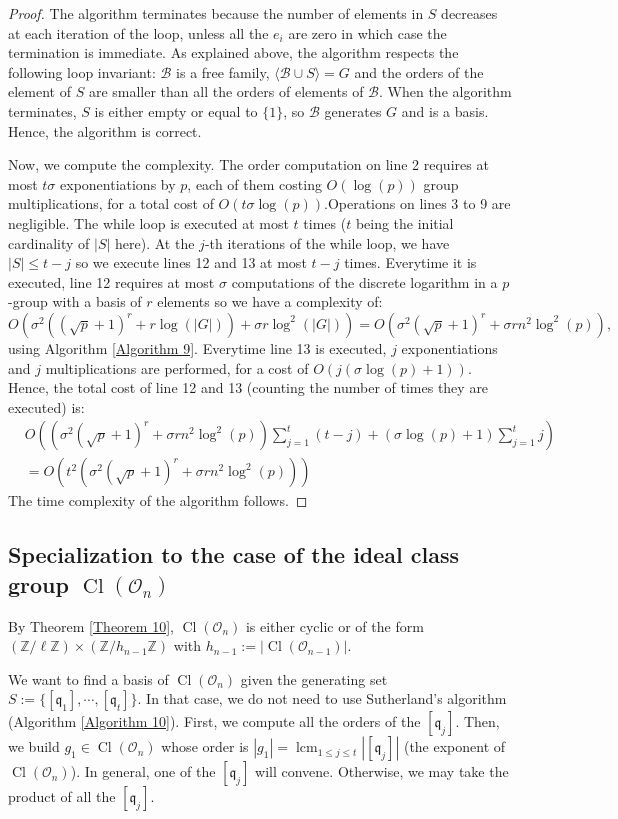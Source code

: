\documentclass[a4paper,10pt,notitlepage]{report}
\theoremstyle{definition}
\theoremstyle{plain}
\theoremstyle{definition}
\newcommand{\Z}{\mathbb{Z}}
\newcommand{\m}[1]{\mathcal{#1}}
\newcommand{\mO}{\mathcal{O}}
\renewcommand{\(}{\left(}
\renewcommand{\)}{\right)}
\newcommand{\mf}[1]{\mathfrak{#1}}
\DeclareMathOperator{\Cl}{Cl}
\DeclareMathOperator{\lcm}{lcm}
\begin{document}
\begin{proof}
The algorithm terminates because the number of elements in $S$ decreases at each iteration of the loop, unless all the $e_i$ are zero in which case the termination is immediate.  As explained above, the algorithm respects the following loop invariant: $\m{B}$ is a free family, $\langle\m{B}\cup S\rangle=G$ and the orders of the element of $S$ are smaller than all the orders of elements of $\m{B}$.  When the algorithm terminates, $S$ is either empty or equal to $\{1\}$, so $\m{B}$ generates $G$ and is a basis. Hence, the algorithm is correct.

Now, we compute the complexity. The order computation on line 2 requires at most $t\sigma$ exponentiations by $p$, each of them costing $O(\log(p))$ group multiplications, for a total cost of $O(t\sigma\log(p))$.Operations on lines 3 to 9 are negligible. The while loop is executed at most $t$ times ($t$ being the initial cardinality of $|S|$ here). At the $j$-th iterations of the while loop, we have $|S|\leq t-j$ so we execute lines 12 and 13 at most $t-j$ times. Everytime it is executed, line 12 requires at most $\sigma$ computations of the discrete logarithm in a $p$-group with a basis of $r$ elements so we have a complexity of:
\[O(\sigma^2((\sqrt{p}+1)^r+r\log(|G|))+\sigma r\log^2(|G|))=O(\sigma^2(\sqrt{p}+1)^r+\sigma rn^2\log^2(p)),\]
using Algorithm \ref{Algorithm 9}.  Everytime line 13 is executed, $j$ exponentiations and $j$ multiplications are performed, for a cost of $O(j(\sigma\log(p)+1))$. Hence, the total cost of line 12 and 13 (counting the number of times they are executed) is:
\begin{align*}&O\((\sigma^2(\sqrt{p}+1)^r+\sigma rn^2\log^2(p))\sum_{j=1}^t(t-j)+(\sigma\log(p)+1)\sum_{j=1}^t j\)\\
&=O(t^2(\sigma^2(\sqrt{p}+1)^r+\sigma rn^2\log^2(p)))
\end{align*}
The time complexity of the algorithm follows.
\end{proof}

\subsection{Specialization to the case of the ideal class group $\Cl(\mO_n)$}

By Theorem \ref{Theorem 10}, $\Cl(\mO_n)$ is either cyclic or of the form $(\Z/\ell\Z)\times(\Z/h_{n-1}\Z)$ with $h_{n-1}:=|\Cl(\mO_{n-1})|$. 

We want to find a basis of $\Cl(\mO_n)$ given the generating set $S:=\{[\mf{q}_1], \cdots, [\mf{q}_t]\}$. In that case, we do not need to use Sutherland's algorithm (Algorithm \ref{Algorithm 10}). First, we compute all the orders of the $[\mf{q}_j]$. Then, we build $g_1\in \Cl(\mO_n)$ whose order is $|g_1|=\lcm_{1\leq j\leq t}|[\mf{q}_j]|$ (the exponent of $\Cl(\mO_n)$). In general, one of the $[\mf{q}_j]$ will convene. Otherwise, we may take the product of all the $[\mf{q}_j]$. 
\end{document}

